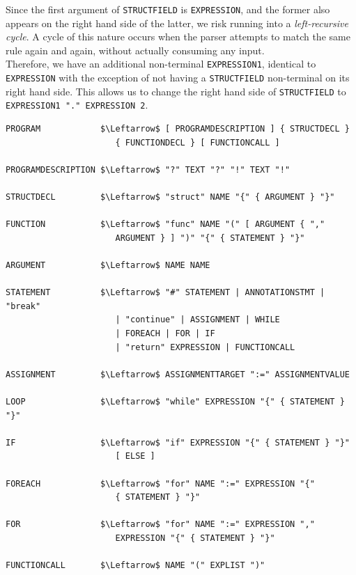 Since the first argument of \texttt{STRUCTFIELD} is \texttt{EXPRESSION}, and the former also appears on the right hand side of the latter, we risk running into a \textit{left-recursive cycle}. A cycle of this nature occurs when the parser attempts to match the same rule again and again, without actually consuming any input. \\

Therefore, we have an additional non-terminal \texttt{EXPRESSION1}, identical to \texttt{EXPRESSION} with the exception of not having a \texttt{STRUCTFIELD} non-terminal on its right hand side. This allows us to change the right hand side of \texttt{STRUCTFIELD} to \texttt{EXPRESSION1 "." EXPRESSION 2}. \\

\begin{lstlisting}[caption={Gourmet's grammar in EBNF notation.}, captionpos=b, label={The EBNF grammar of the Gourmet programming language.}]
PROGRAM            $\Leftarrow$ [ PROGRAMDESCRIPTION ] { STRUCTDECL }
                      { FUNCTIONDECL } [ FUNCTIONCALL ]

PROGRAMDESCRIPTION $\Leftarrow$ "?" TEXT "?" "!" TEXT "!"

STRUCTDECL         $\Leftarrow$ "struct" NAME "{" { ARGUMENT } "}"

FUNCTION           $\Leftarrow$ "func" NAME "(" [ ARGUMENT { ","
                      ARGUMENT } ] ")" "{" { STATEMENT } "}"

ARGUMENT           $\Leftarrow$ NAME NAME

STATEMENT          $\Leftarrow$ "#" STATEMENT | ANNOTATIONSTMT | "break"
                      | "continue" | ASSIGNMENT | WHILE
                      | FOREACH | FOR | IF
                      | "return" EXPRESSION | FUNCTIONCALL

ASSIGNMENT         $\Leftarrow$ ASSIGNMENTTARGET ":=" ASSIGNMENTVALUE

LOOP               $\Leftarrow$ "while" EXPRESSION "{" { STATEMENT } "}"

IF                 $\Leftarrow$ "if" EXPRESSION "{" { STATEMENT } "}"
                      [ ELSE ]

FOREACH            $\Leftarrow$ "for" NAME ":=" EXPRESSION "{"
                      { STATEMENT } "}"

FOR                $\Leftarrow$ "for" NAME ":=" EXPRESSION ","
                      EXPRESSION "{" { STATEMENT } "}"

FUNCTIONCALL       $\Leftarrow$ NAME "(" EXPLIST ")"


\end{lstlisting}
